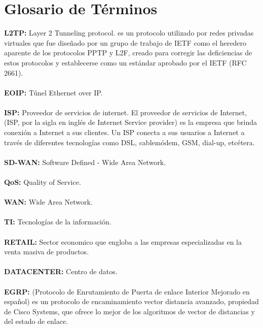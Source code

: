 \chapter{Glosario de Términos}
\label{cha:Glosario de Términos}

	\textbf{L2TP:} Layer 2 Tunneling protocol. es un protocolo utilizado por redes privadas virtuales que fue diseñado por un grupo de trabajo de IETF como el heredero aparente de los protocolos PPTP y L2F, creado para corregir las deficiencias de estos protocolos y establecerse como un estándar aprobado por el IETF (RFC 2661).
	\\
	\\
	\textbf{EOIP:} Túnel Ethernet over IP.
	\\
	\\
	\textbf{ISP:} Proveedor de servicios de internet. El proveedor de servicios de Internet, (ISP, por la sigla en inglés de Internet Service provider) es la empresa que brinda conexión a Internet a sus clientes. Un ISP conecta a sus usuarios a Internet a través de diferentes tecnologías como DSL, cablemódem, GSM, dial-up, etcétera.
	\\
	\\
	\textbf{SD-WAN:} Software Defined - Wide Area Network.
	\\
	\\
	\textbf{QoS:} Quality of Service.
	\\
	\\
	\textbf{WAN:} Wide Area Network.
	\\
	\\
	\textbf{TI:} Tecnologías de la información.
	\\
	\\
	\textbf{RETAIL:} Sector economico que engloba a las empresas especializadas en la venta masiva de productos.
	\\
	\\
	\textbf{DATACENTER:} Centro de datos.
	\\
	\\
	\textbf{EGRP:} (Protocolo de Enrutamiento de Puerta de enlace Interior Mejorado en español) es un protocolo de encaminamiento vector distancia avanzado, propiedad de Cisco Systems, que ofrece lo mejor de los algoritmos de vector de distancias y del estado de enlace.
	\\
